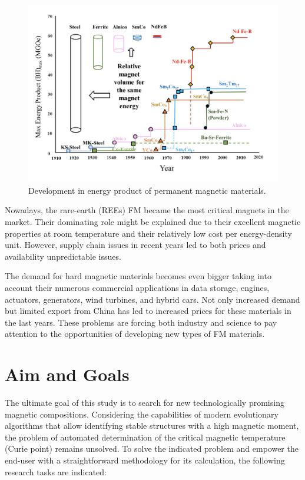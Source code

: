 \begin{figure}[H]
	\centering
	\includegraphics{fig/review/history.png}
	\caption[Development in energy product of permanent magnetic materials]{Development in energy product of permanent magnetic materials.}
	\label{fig:history}
\end{figure}

Nowadays, the rare-earth (REEs) FM became the most critical magnets in the market. Their dominating role might be explained due to their excellent magnetic properties at room temperature and their relatively low cost per energy-density unit. However, supply chain issues in recent years led to both prices and availability unpredictable issues.

The demand for hard magnetic materials becomes even bigger taking into account their numerous commercial applications in data storage, engines, actuators, generators, wind turbines, and hybrid cars. Not only increased demand but limited export from China has led to increased prices for these materials in the last years. These problems are forcing both industry and science to pay attention to the opportunities of developing new types of FM materials.

\section{Aim and Goals}

The ultimate goal of this study is to search for new technologically promising magnetic compositions. Considering the capabilities of modern evolutionary algorithms that allow identifying stable structures with a high magnetic moment, the problem of automated determination of the critical magnetic temperature (Curie point) remains unsolved. To solve the indicated problem and empower the end-user with a straightforward methodology for its calculation, the following research tasks are indicated:


